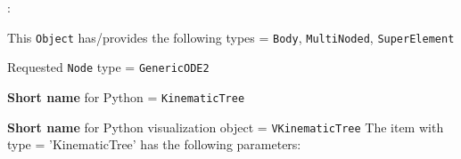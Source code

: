 \noindent {}:
\bi
  \item This \texttt{Object} has/provides the following types = \texttt{Body}, \texttt{MultiNoded}, \texttt{SuperElement}
  \item Requested \texttt{Node} type = \texttt{GenericODE2}
  \item {\bf Short name} for Python = \texttt{KinematicTree}
  \item {\bf Short name} for Python visualization object = \texttt{VKinematicTree}
\ei\vspace{12pt} \noindent 
The item  with type = 'KinematicTree' has the following parameters:
\vspace{-0.5cm}\\
\vspace{-0.5cm}\\
